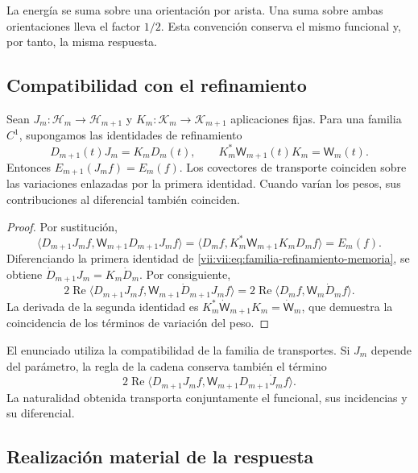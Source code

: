 La energía se suma sobre una orientación por arista. Una suma sobre ambas
orientaciones lleva el factor \(1/2\). Esta convención conserva el mismo
funcional y, por tanto, la misma respuesta.

\subsection{Compatibilidad con el refinamiento}
\label{vii:vii:subsec:refinamiento-respuesta}

\begin{theorem}
\label{vii:vii:thm:refinamiento-respuesta}
Sean \(J_m:\mathcal H_m\to\mathcal H_{m+1}\) y
\(K_m:\mathcal K_m\to\mathcal K_{m+1}\) aplicaciones fijas.
Para una familia \(C^1\), supongamos las identidades de refinamiento
\begin{equation}
 D_{m+1}(t)J_m=K_mD_m(t),\qquad
 K_m^*\mathsf W_{m+1}(t)K_m=\mathsf W_m(t).
 \label{vii:vii:eq:familia-refinamiento-memoria}
\end{equation}
Entonces \(E_{m+1}(J_mf)=E_m(f)\).
Los covectores de transporte coinciden sobre las variaciones enlazadas
por la primera identidad. Cuando varían los pesos, sus contribuciones
al diferencial también coinciden.
\end{theorem}

\begin{proof}
Por sustitución,
\[
 \langle D_{m+1}J_mf,\mathsf W_{m+1}D_{m+1}J_mf\rangle
 =\langle D_mf,K_m^*\mathsf W_{m+1}K_mD_mf\rangle=E_m(f).
\]
Diferenciando la primera identidad de
\eqref{vii:vii:eq:familia-refinamiento-memoria}, se obtiene
\(\dot D_{m+1}J_m=K_m\dot D_m\). Por consiguiente,
\[
 2\operatorname{Re}
 \langle D_{m+1}J_mf,\mathsf W_{m+1}\dot D_{m+1}J_mf\rangle
 =2\operatorname{Re}\langle D_mf,\mathsf W_m\dot D_mf\rangle.
\]
La derivada de la segunda identidad es
\(K_m^*\dot{\mathsf W}_{m+1}K_m=\dot{\mathsf W}_m\), que demuestra
la coincidencia de los términos de variación del peso.
\end{proof}

El enunciado utiliza la compatibilidad de la familia de transportes.
Si \(J_m\) depende del parámetro, la regla de la cadena conserva
también el término
\[
 2\operatorname{Re}
 \langle D_{m+1}J_mf,\mathsf W_{m+1}D_{m+1}\dot J_mf\rangle.
\]
La naturalidad obtenida transporta conjuntamente el funcional, sus
incidencias y su diferencial.

\subsection{Realización material de la respuesta}
\label{vii:vii:subsec:realizacion-respuesta-discreta}

